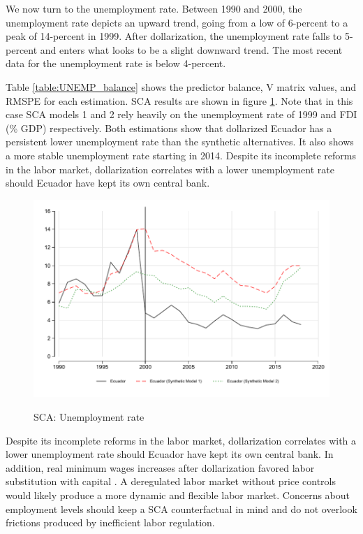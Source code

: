 \documentclass[12pt]{article}
\begin{document}
We now turn to the unemployment rate. Between 1990 and 2000, the unemployment rate depicts an upward trend, going from a low of 6-percent to a peak of 14-percent in 1999. After dollarization, the unemployment rate falls to 5-percent and enters what looks to be a slight downward trend. The most recent data for the unemployment rate is below 4-percent. 

Table \ref{table:UNEMP_balance} shows the predictor balance, V matrix values, and RMSPE for each estimation. SCA results are shown in figure \ref{fig:SCA_UNEMP}. Note that in this case SCA models 1 and 2 rely heavily on the unemployment rate of 1999 and FDI (\% GDP) respectively. Both estimations show that dollarized Ecuador has a persistent lower unemployment rate than the synthetic alternatives. It also shows a more stable unemployment rate starting in 2014. Despite its incomplete reforms in the labor market, dollarization correlates with a lower unemployment rate should Ecuador have kept its own central bank.



\begin{figure}[!h]
    \caption{SCA: Unemployment rate}
    \centering
    \includegraphics{STATA/Fig_UNEMP_SCA.pdf}
    \label{fig:SCA_UNEMP}
\end{figure}

Despite its incomplete reforms in the labor market, dollarization correlates with a lower unemployment rate should Ecuador have kept its own central bank. In addition, real minimum wages increases after dollarization favored labor substitution with capital \parencite{Soto2009}. A deregulated labor market without price controls would likely produce a more dynamic and flexible labor market. Concerns about employment levels should keep a SCA counterfactual in mind and do not overlook frictions produced by inefficient labor regulation.
\end{document}
